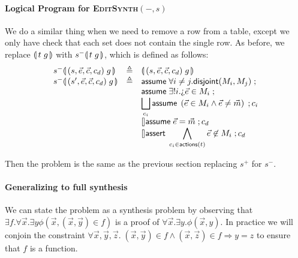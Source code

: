 \paragraph{Logical Program for \textsc{EditSynth}$(-,s)$}

We do a similar thing when we need to remove a row from a table, except we only
have check that each set does not contain the single row. As before, we replace
$\llparenthesis\, t\;g\, \rrparenthesis$ with $s^-\llparenthesis\, t\; g\, \rrparenthesis$, which is defined as follows:
\[\begin{array}{lcl}
    s^-\parenbb{(s,\vec e, \vec c, c_d) \; g}
    &\triangleq
    & \parenbb{(s,\vec e, \vec c, c_d) \; g} \\
    s^-\parenbb{(s',\vec e, \vec c, c_d) \; g}
    &\triangleq
    & \assume{\forall i\neq j. \mathsf{disjoint}(M_i,M_j)}; \\
    && \assume{\exists! i. \hole{\vec e} \in M_i};\\
    && \displaystyle \Angel_{c_i}
       \assume{\left(\vec e \in M_i\wedge \vec e \neq \vec m \right )}; c_i\\
    && \angel \assume{\vec e = \vec m}; c_d \\
    && \displaystyle \angel \assert{\bigwedge_{c_i \in \actions t} \vec e \not\in M_i}; c_d
\end{array}\]

Then the problem is the same as the previous section replacing $s^+$ for $s^-$.

\paragraph{Generalizing to full synthesis}

We can state the problem as a synthesis problem by observing that
$\exists f. \forall \vec x. \exists y \phi(\vec x, (\vec x,\vec y) \in
f)$ is a proof of $\forall \vec x. \exists y. \phi(\vec x, y)$. In
practice we will conjoin the constraint
$\forall \vec x, \vec y, \vec z.\; (\vec x, \vec y) \in f \wedge (\vec
x, \vec z) \in f \Rightarrow y = z$ to ensure that $f$ is a function.


